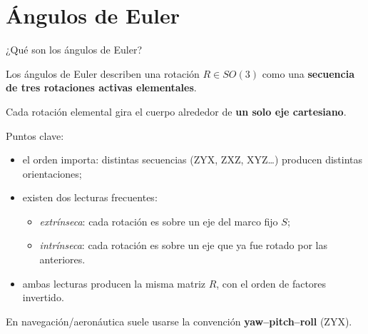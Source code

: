 \documentclass[11pt]{beamer}
\newcommand{\srcShuster}{\href{https://ru.scribd.com/doc/155830038/A-Survey-of-Attitude-Representations}{Shuster (1993)}}
\newcommand{\srcMarkley}{\href{https://notes.jaydickson.net/assets/resources/Textbooks/Markley\%20and\%20Crassidis\%20-\%202014\%20-\%20Fundamentals\%20of\%20Spacecraft\%20Attitude\%20Determination\%20.pdf}{Markley \& Crassidis (2014)}{Markley \& Crassidis (2014)}}
\newcommand{\SourceLine}[1]{\vfill{\tiny\textcolor{gray}{Fuentes: #1}}}
\begin{document}
%
%
%
%
%





\section{Ángulos de Euler}


\begin{frame}{¿Qué son los ángulos de Euler?}

Los ángulos de Euler describen una rotación \(R \in SO(3)\) como una \textbf{secuencia de tres rotaciones activas elementales}.

\medskip
Cada rotación elemental gira el cuerpo alrededor de \textbf{un solo eje cartesiano}.

\medskip
Puntos clave:
\begin{itemize}
  \item el orden importa: distintas secuencias (ZYX, ZXZ, XYZ\ldots) producen distintas orientaciones;
  \item existen dos lecturas frecuentes:
  \begin{itemize}
    \item \emph{extrínseca}: cada rotación es sobre un eje del marco fijo \(S\);
    \item \emph{intrínseca}: cada rotación es sobre un eje que ya fue rotado por las anteriores.
  \end{itemize}
  \item ambas lecturas producen la misma matriz \(R\), con el orden de factores invertido.
\end{itemize}

\medskip
En navegación/aeronáutica suele usarse la convención \textbf{yaw--pitch--roll} (ZYX).

\end{frame}
\end{document}
